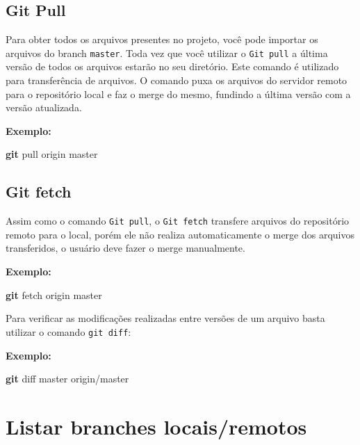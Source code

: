 \documentclass[
  a5paper,
  pagesize,
  9pt,
  pointlessnumbers,
  normalheadings,
  twoside=false
]{book}
\newenvironment{Shaded}{\begin{snugshade}}{\end{snugshade}}
\newcommand{\KeywordTok}[1]{\textcolor[rgb]{0.13,0.29,0.53}{\textbf{{#1}}}}
\newcommand{\NormalTok}[1]{{#1}}
\begin{document}
\subsection{Git Pull}\label{git-pull}

Para obter todos os arquivos presentes no projeto, você pode importar os
arquivos do branch \texttt{master}. Toda vez que você utilizar o
\texttt{Git pull} a última versão de todos os arquivos estarão no seu
diretório. Este comando é utilizado para transferência de arquivos. O
comando puxa os arquivos do servidor remoto para o repositório local e
faz o merge do mesmo, fundindo a última versão com a versão atualizada.

\textbf{Exemplo:}

\begin{Shaded}
\begin{Highlighting}[]
\KeywordTok{git} \NormalTok{pull origin master}
\end{Highlighting}
\end{Shaded}

\subsection{Git fetch}\label{git-fetch}

Assim como o comando \texttt{Git pull}, o \texttt{Git fetch} transfere
arquivos do repositório remoto para o local, porém ele não realiza
automaticamente o merge dos arquivos transferidos, o usuário deve fazer
o merge manualmente.

\textbf{Exemplo:}

\begin{Shaded}
\begin{Highlighting}[]
\KeywordTok{git} \NormalTok{fetch origin master}
\end{Highlighting}
\end{Shaded}

Para verificar as modificações realizadas entre versões de um arquivo
basta utilizar o comando \texttt{git diff}:

\textbf{Exemplo:}

\begin{Shaded}
\begin{Highlighting}[]
\KeywordTok{git} \NormalTok{diff master origin/master}
\end{Highlighting}
\end{Shaded}

\section{Listar branches
locais/remotos}\label{listar-branches-locaisremotos}
\end{document}
